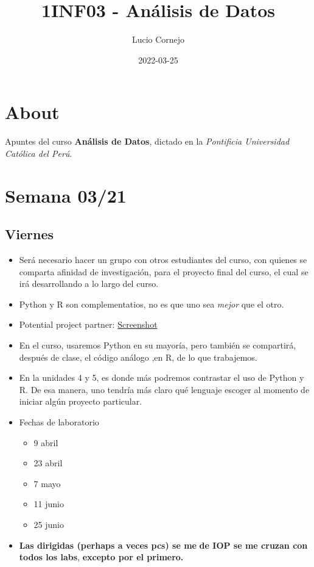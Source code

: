 \documentclass[
]{book}
\title{1INF03 - Análisis de Datos}
\author{Lucio Cornejo}
\date{2022-03-25}
\providecommand{\tightlist}{%
  \setlength{\itemsep}{0pt}\setlength{\parskip}{0pt}}
\begin{document}
\maketitle

{
\setcounter{tocdepth}{1}
\tableofcontents
}
\hypertarget{about}{%
\chapter*{About}\label{about}}

Apuntes del curso \textbf{Análisis de Datos},
dictado en la \emph{Pontificia Universidad Católica del Perú}.

\hypertarget{semana-0321}{%
\chapter{Semana 03/21}\label{semana-0321}}

\hypertarget{viernes}{%
\section{Viernes}\label{viernes}}

\begin{itemize}
\item
  Será necesario hacer un grupo con otros
  estudiantes del curso, con quienes se
  comparta afinidad de investigación, para
  el proyecto final del curso, el cual se
  irá desarrollando a lo largo del curso.
\item
  Python y R son complementatios, no
  es que uno sea \emph{mejor} que el otro.
\item
  Potential project partner:
  \href{C:/Users/HP/Pictures/Screenshots/Captura\%20de\%20pantalla\%20(2118).png}{Screenshot}
\item
  En el curso, usaremos Python en su mayoría,
  pero también se compartirá, después de clase,
  el código análogo ,en R, de lo que trabajemos.
\item
  En la unidades 4 y 5, es donde más podremos
  contrastar el uso de Python y R. De esa manera,
  uno tendría más claro qué lenguaje escoger al
  momento de iniciar algún proyecto particular.
\item
  Fechas de laboratorio\\

  \begin{itemize}
  \tightlist
  \item
    9 abril
  \item
    23 abril
  \item
    7 mayo
  \item
    11 junio
  \item
    25 junio
  \end{itemize}
\item
  \textbf{Las dirigidas (perhaps a veces pcs) se me}
  \textbf{de IOP se me cruzan con todos los labs},
  \textbf{excepto por el primero.}
\end{itemize}
\end{document}
